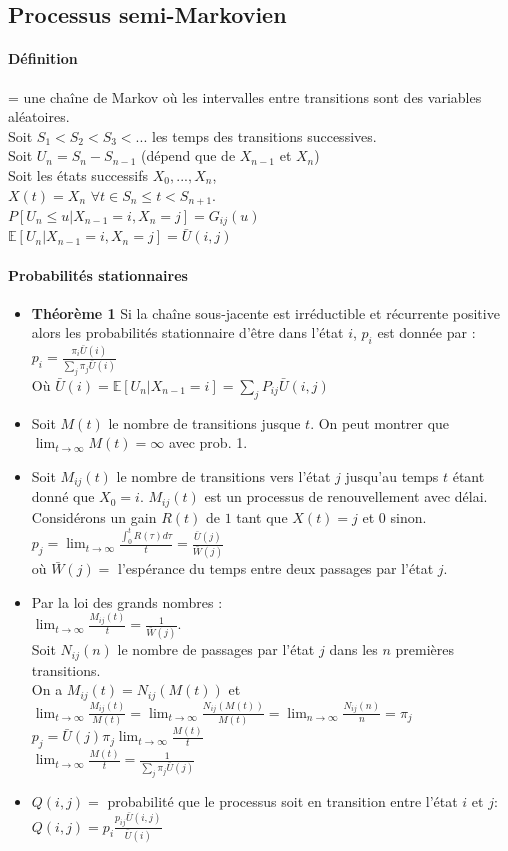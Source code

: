 \documentclass[paper=a4,fontsize=8pt,pagesize,DIV=calc]{scrartcl}
\begin{document}
\begin{multicols}{3}
\section{Processus semi-Markovien}
\paragraph{Définition}= une chaîne de Markov où les intervalles entre transitions sont des variables aléatoires. 
\\Soit $S_1 < S_2 < S_3 < ...$ les temps des transitions successives.
\\Soit $U_n = S_n -S_{n-1}$ (dépend que de $X_{n-1}$ et $X_n$)
\\Soit les états successifs $X_0,...,X_n$,
\\ $X(t) = X_n$ $\forall t \in S_n \leq  t < S_{n+1}$.
\\$P[U_n\leq  u|X_{n-1} = i,X_n = j] = G_{ij}(u)$
\\ $\mathbb{E}[U_n|X_{n-1} = i,X_n = j] = \bar{U} (i, j)$
\paragraph{Probabilités stationnaires}
\begin{itemize}
\item \textbf{Théorème 1} Si la chaîne sous-jacente est irréductible et récurrente positive alors les probabilités stationnaire d’être dans l’état $i$, $p_i$ est donnée par :
$p_i =\frac{\pi_i \bar{U}(i)}{\sum_j \pi_j\bar{U} (i)}$
\\ Où $\bar{U} (i) = \mathbb{E}[U_n|X_{n-1} = i] = \sum_j P_{ij}\bar{U} (i, j)$
\item Soit $M(t)$ le nombre de transitions jusque $t$. On peut montrer que $\lim_{t\to\infty}M(t) = \infty $ avec prob. 1.
\item Soit $M_{ij}(t)$ le nombre de transitions vers l'état $j$ jusqu'au
temps $t$ étant donné que $X_0 = i$.
$M_{ij}(t)$ est un processus de renouvellement avec délai.
Considérons un gain $R(t)$ de $1$ tant que $X(t) = j$ et $0$ sinon.
\\$p_j = \lim_{t\to\infty}\frac{\int_0^t R(\tau)d\tau}{t}=\frac{\bar{U}(j)}{\bar{W}(j)}$
\\où $\bar{W}(j)=$ l’espérance du temps entre deux passages par l’état $j$.
\item Par la loi des grands nombres : \\$\lim_{t\to\infty}\frac{M_{ij}(t)}{t}=
\frac{1}{\bar{W}(j)}$.
\\ Soit $N_{ij}(n)$ le nombre de passages par l’état $j$ dans les $n$ premières transitions.
\\On a $M_{ij}(t) = N_{ij}(M(t))$ et $\lim_{t \to \infty}\frac{M_{ij}(t)}{M(t)}=\lim_{t\to\infty}\frac{N_{ij}(M(t))}{M(t)}=\lim_{n\to\infty}\frac{N_{ij}(n)}{n}=\pi_j$
\\ $p_j=\bar{U}(j)\pi_j \lim_{t\to\infty}\frac{M(t)}{t}$
\\$\lim_{t\to\infty} \frac{M(t)}{t}=\frac{1}{\sum_j \pi_j \bar{U}(j)}$
\item$ Q(i, j)=$  probabilité que le processus soit en transition
entre l’état $i$ et $j$: $Q(i, j) = p_i \frac{p_{ij}\bar{U}(i, j)}{\bar{U}(i)}$
\end{itemize}

\end{multicols}
\end{document}
